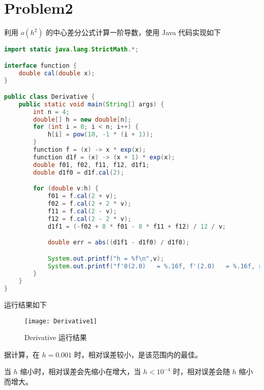 \documentclass[UTF8]{ctexart}
\begin{document}
    \section{Problem2}\label{sec:2}
    利用 \(o(h^2)\) 的中心差分公式计算一阶导数，使用 Java 代码实现如下
    \begin{lstlisting}[language=Java, breaklines = true,label={lst:lstlisting2}]
import static java.lang.StrictMath.*;

interface function {
    double cal(double x);
}

public class Derivative {
    public static void main(String[] args) {
        int n = 4;
        double[] h = new double[n];
        for (int i = 0; i < n; i++) {
            h[i] = pow(10, -1 * (i + 1));
        }
        function f = (x) -> x * exp(x);
        function d1f = (x) -> (x + 1) * exp(x);
        double f01, f02, f11, f12, d1f1;
        double d1f0 = d1f.cal(2);

        for (double v:h) {
            f01 = f.cal(2 + v);
            f02 = f.cal(2 + 2 * v);
            f11 = f.cal(2 - v);
            f12 = f.cal(2 - 2 * v);
            d1f1 = (-f02 + 8 * f01 - 8 * f11 + f12) / 12 / v;

            double err = abs((d1f1 - d1f0) / d1f0);

            System.out.printf("h = %f\n",v);
            System.out.printf("f'0(2.0)   = %.16f, f'(2.0)   = %.16f, relative error = %.16f\n",d1f0, d1f1, err);
        }
    }
}
    \end{lstlisting}

    运行结果如下
    \begin{figure}[h]
        \centering
        \texttt{[image: Derivative1]}
        \caption{Derivative 运行结果}\label{fig:figure2}
    \end{figure}

    据计算，在 \(h = 0.001\) 时，相对误差较小，是该范围内的最佳。

    当 \(h\) 缩小时，相对误差会先缩小在增大，当 \(h < 10^{-4}\) 时，相对误差会随 \(h\) 缩小而增大。

    \newpage
\end{document}
